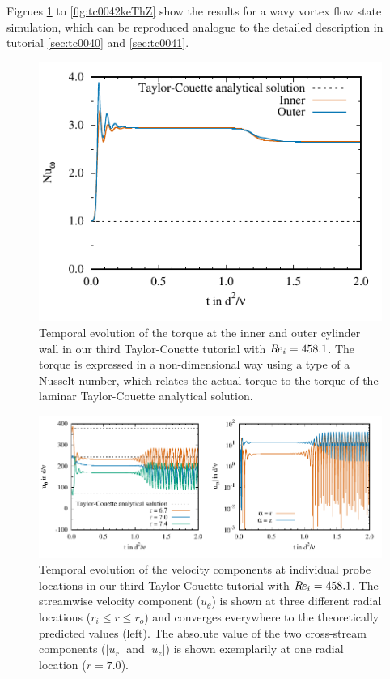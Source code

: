 \documentclass[a4paper, 11pt, DIV=11]{scrartcl}
\begin{document}
Figrues \ref{fig:tc0042torque} to \ref{fig:tc0042keThZ} show the results for
a wavy vortex flow state simulation, which can be reproduced analogue to the
detailed description in tutorial \ref{sec:tc0040} and \ref{sec:tc0041}.\begin{figure}[htb]
\centering
\includegraphics[scale=1.0]{figures/tc0042/torque}
\caption{Temporal evolution of the torque at the inner and outer cylinder
wall in our third Taylor-Couette tutorial  with $R\hspace{-0.1em}e_{i}=\num{458.1}$.
The torque is expressed in a non-dimensional way using a type of a Nusselt
number, which relates the actual torque to the torque of the laminar
Taylor-Couette analytical solution.}
\label{fig:tc0042torque}
\end{figure}
\begin{figure}[htb]
\centering
\includegraphics[scale=1.00]{figures/tc0042/probes}
\caption{Temporal evolution of the velocity components at individual probe
locations in our third Taylor-Couette tutorial  with $R\hspace{-0.1em}e_{i}=\num{458.1}$.
The streamwise velocity component ($u_{\theta}$) is shown
at three different radial locations ($r_{i}\le r\le r_{o}$) and converges
everywhere to the theoretically predicted values (left). The absolute value of
the two cross-stream components ($|u_r|$ and $|u_z|$) is shown exemplarily at
one radial location ($r=\num{7.0}$).}
\label{fig:tc0042probes}
\end{figure}
\end{document}
